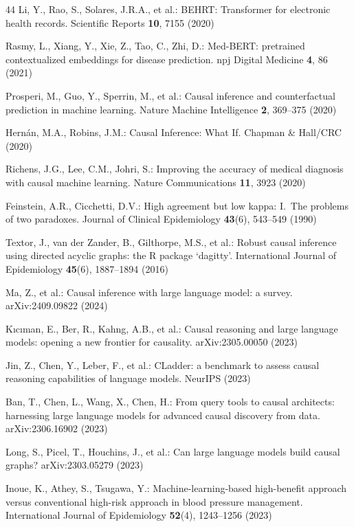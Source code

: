 \documentclass[runningheads]{llncs}
\begin{document}
\begin{thebibliography}{44}
Li, Y., Rao, S., Solares, J.R.A., et al.:
BEHRT: Transformer for electronic health records.
Scientific Reports \textbf{10}, 7155 (2020)

Rasmy, L., Xiang, Y., Xie, Z., Tao, C., Zhi, D.:
Med-BERT: pretrained contextualized embeddings for disease prediction.
npj Digital Medicine \textbf{4}, 86 (2021)

Prosperi, M., Guo, Y., Sperrin, M., et al.:
Causal inference and counterfactual prediction in machine learning.
Nature Machine Intelligence \textbf{2}, 369--375 (2020)

Hern\'{a}n, M.A., Robins, J.M.:
Causal Inference: What If.
Chapman \& Hall/CRC (2020)

Richens, J.G., Lee, C.M., Johri, S.:
Improving the accuracy of medical diagnosis with causal machine learning.
Nature Communications \textbf{11}, 3923 (2020)

Feinstein, A.R., Cicchetti, D.V.:
High agreement but low kappa: I.\ The problems of two paradoxes.
Journal of Clinical Epidemiology \textbf{43}(6), 543--549 (1990)

Textor, J., van der Zander, B., Gilthorpe, M.S., et al.:
Robust causal inference using directed acyclic graphs: the R package `dagitty'.
International Journal of Epidemiology \textbf{45}(6), 1887--1894 (2016)

Ma, Z., et al.:
Causal inference with large language model: a survey.
arXiv:2409.09822 (2024)

K{\i}c{\i}man, E., Ber, R., Kahng, A.B., et al.:
Causal reasoning and large language models: opening a new frontier
for causality.
arXiv:2305.00050 (2023)

Jin, Z., Chen, Y., Leber, F., et al.:
CLadder: a benchmark to assess causal reasoning capabilities of
language models.
NeurIPS (2023)

Ban, T., Chen, L., Wang, X., Chen, H.:
From query tools to causal architects: harnessing large language
models for advanced causal discovery from data.
arXiv:2306.16902 (2023)

Long, S., Picel, T., Houchins, J., et al.:
Can large language models build causal graphs?
arXiv:2303.05279 (2023)

Inoue, K., Athey, S., Tsugawa, Y.:
Machine-learning-based high-benefit approach versus
conventional high-risk approach in blood pressure management.
International Journal of Epidemiology \textbf{52}(4), 1243--1256 (2023)


\end{thebibliography}
\end{document}
